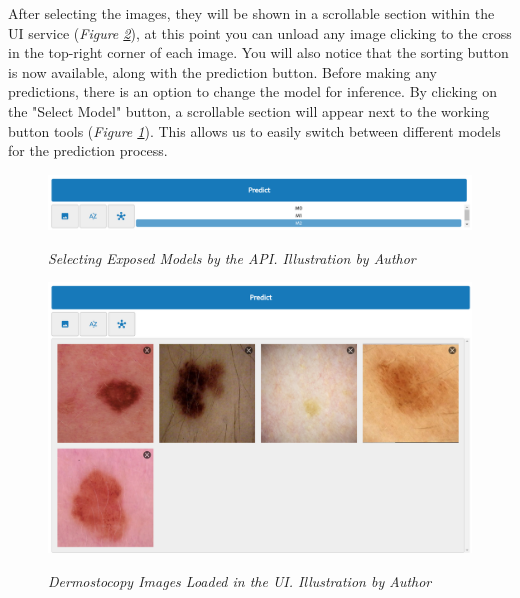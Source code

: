 After selecting the images, they will be shown in a scrollable section within the UI service (\textit{Figure \ref{fig:loaded-images}}),
at this point you can unload any image clicking to the cross in the top-right corner of each image.
You will also notice that the sorting button is now available,
along with the prediction button. Before making any predictions, there is an option to change the model for inference. By clicking on the "Select Model" button,
a scrollable section will appear next to the working button tools (\textit{Figure \ref{fig:selecting-model}}).
This allows us to easily switch between different models for the prediction process.

\begin{figure}[H]
\centering
    \includegraphics[width=\textwidth]{imatges/results/selecting-model.png}
\caption[Selecting Exposed Models by the API]{\textit{Selecting Exposed Models by the API. Illustration by Author}}
  {\label{fig:selecting-model}}
\end{figure}


\begin{figure}[H]
\centering
\begin{adjustbox}{width=\textwidth, trim={0cm 3.5cm 0cm 0cm}, clip}
    \includegraphics[width=\textwidth]{imatges/results/loaded-images.png}
\end{adjustbox}
\caption[Dermostocopy Images Loaded in the UI]{\textit{Dermostocopy Images Loaded in the UI. Illustration by Author}}
{\label{fig:loaded-images}}
\end{figure}

